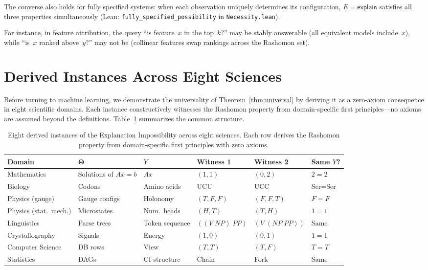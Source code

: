 \documentclass[11pt,a4paper]{article}
\newcommand{\Params}{\mathbf{\Theta}}
\begin{document}
The converse also holds for fully specified systems: when each observation
uniquely determines its configuration, $E = \mathsf{explain}$ satisfies all
three properties simultaneously (Lean: \texttt{fully\_specified\_possibility}
in \texttt{Necessity.lean}).



For instance, in feature attribution, the query ``is feature~$x$ in the top~$k$?'' may be stably answerable (all equivalent models include~$x$), while ``is~$x$ ranked above~$y$?'' may not be (collinear features swap rankings across the Rashomon set).

\section{Derived Instances Across Eight Sciences}
\label{sec:derived-instances}

Before turning to machine learning, we demonstrate the universality of
Theorem~\ref{thm:universal} by deriving it as a zero-axiom consequence in
eight scientific domains.  Each instance constructively witnesses the Rashomon
property from domain-specific first principles---no axioms are assumed beyond
the definitions.  Table~\ref{tab:unification} summarizes the common structure.

\begin{table}[t]
\centering
\caption{Eight derived instances of the Explanation Impossibility across eight sciences. Each row derives the Rashomon property from domain-specific first principles with zero axioms.}
\label{tab:unification}
\begin{tabular}{llllll}
\toprule
Domain & $\Params$ & $Y$ & Witness 1 & Witness 2 & Same $Y$? \\
\midrule
Mathematics & Solutions of $Ax=b$ & $Ax$ & $(1,1)$ & $(0,2)$ & $2=2$ \\
Biology & Codons & Amino acids & UCU & UCC & Ser=Ser \\
Physics (gauge) & Gauge configs & Holonomy & $(T,F,F)$ & $(F,F,T)$ & $F=F$ \\
Physics (stat.\ mech.) & Microstates & Num.\ heads & $(H,T)$ & $(T,H)$ & $1=1$ \\
Linguistics & Parse trees & Token sequence & $((V\;NP)\;PP)$ & $(V\;(NP\;PP))$ & Same \\
Crystallography & Signals & Energy & $(1,0)$ & $(0,1)$ & $1=1$ \\
Computer Science & DB rows & View & $(T,T)$ & $(T,F)$ & $T=T$ \\
Statistics & DAGs & CI structure & Chain & Fork & Same \\
\bottomrule
\end{tabular}
\end{table}
\end{document}
